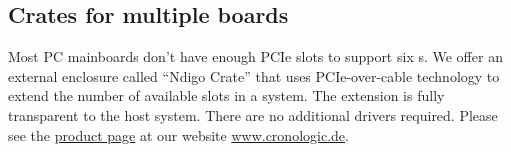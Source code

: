 {        \subsection{Crates for multiple boards}
            Most PC mainboards don't have enough PCIe slots to support six
            \deviceName s.  We offer an external enclosure called ``Ndigo
            Crate'' that uses PCIe-over-cable technology to extend the number
            of available slots in a system.  The extension is fully
            transparent to the host system. There are no additional drivers
            required.  Please see the
            \href{https://www.cronologic.de/products/pcie/pcie-crates}{%
                product page} at our website \url{www.cronologic.de}.
}{}




    


